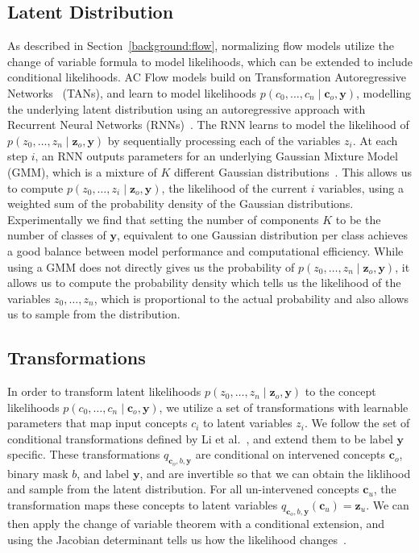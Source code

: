 \subsection{Latent Distribution}

As described in Section~\ref{background:flow}, 
normalizing flow models utilize the change of variable formula to model likelihoods,
which can be extended to include conditional likelihoods. AC Flow models build on
Transformation Autoregressive
Networks~\cite{tans} (TANs), and learn to model 
likelihoods $p(c_0,\ldots, c_n \mid \mathbf{c}_o ,\mathbf{y})$,
modelling the underlying latent distribution using an autoregressive approach with Recurrent
Neural Networks (RNNs)~\cite{rnn}. The RNN learns to model the likelihood of 
$p(z_0, \ldots, z_n \mid \mathbf{z}_o , \mathbf{y})$ by sequentially processing each of the variables
 $z_i$.
At each step $i$, an RNN outputs parameters for an underlying Gaussian Mixture Model (GMM),
which is a mixture of $K$ different Gaussian distributions~\cite{gmm}.
This allows us to compute $p(z_0, \ldots, z_i \mid \mathbf{z}_o , \mathbf{y})$,
the likelihood of the current $i$ variables,
using a weighted
sum of the probability density of the Gaussian distributions. Experimentally
we find that setting the number of components $K$ to be the number of classes of
$\mathbf{y}$, equivalent to one Gaussian distribution per 
class 
achieves
a good balance between model performance and computational efficiency.
While using a GMM does not directly gives us the probability of
$p(z_0, \ldots, z_n \mid \mathbf{z}_o , \mathbf{y})$, 
it allows us to compute the probability density which tells us the likelihood of the
 variables $z_0, \ldots, z_n$, which is proportional
 to the actual probability and also allows us to sample from the distribution.

\subsection{Transformations}
In order to transform latent likelihoods $p(z_0, \ldots, z_n \mid \mathbf{z}_o , \mathbf{y})$ to 
the concept likelihoods
$p(c_0,\ldots, c_n \mid \mathbf{c}_o , \mathbf{y})$, we
utilize a set of transformations with learnable parameters that 
map input concepts $c_i$ to latent variables $z_i$. We follow the 
set of conditional transformations defined by Li et al.~\cite{acflow}, and extend them to
be label $\mathbf{y}$ specific.
These transformations $q_{\mathbf{c}_o, b, \mathbf{y}}$ are
conditional on 
intervened concepts $\mathbf{c}_o$, binary mask $b$, and label $\mathbf{y}$, 
and are invertible so that we can obtain the liklihood and 
sample from the latent distribution. 
For all un-intervened concepts $\mathbf{c}_u$,
the transformation maps these concepts to latent variables $q_{\mathbf{c}_o, b, \mathbf{y}}(\mathbf{c}_u) = \mathbf{z}_u$. 
We can then apply the change
of variable theorem with a conditional extension, and using
the Jacobian determinant tells us how the likelihood changes~\cite{normalizing-flows}.


